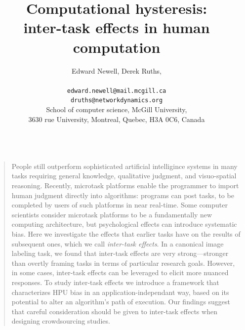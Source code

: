\documentclass[12pt]{article}
\title{Computational hysteresis:\\ inter-task effects in human computation}
\author
{Edward Newell, Derek Ruths,\\
\\
\normalsize{\texttt{edward.newell@mail.mcgill.ca}}\\
\normalsize{\texttt{druths@networkdynamics.org}}\\
\normalsize{School of computer science, McGill University,}\\
\normalsize{3630 rue University, Montreal, Quebec, H3A 0C6, Canada}\\
\\
}
\date{}
\newenvironment{sciabstract}{%
\begin{quote} \bf}
{\end{quote}}
\begin{document}
 


\baselineskip24pt


\maketitle 




\begin{sciabstract}

People still outperform sophisticated artificial 
intelligince systems in many tasks requiring general knowledge, 
qualitative judgment, and visuo-spatial reasoning. Recently, microtask 
platforms enable the programmer to import human judgment directly into 
algorithms: programs can post tasks, to be completed by users of such 
platforms in near real-time.
Some computer scientists consider microtask platforms to be a fundamentally
new computing architecture, but psychological effects can introduce systematic
bias. 
Here we investigate the effects that earlier tasks have on the results of 
subsequent ones, which we call \textit{inter-task effects}.
In a canonical image labeling task, we found that inter-task effects are
very strong---stronger than overtly framing tasks in terms of 
particular research goals.  However, in some cases, inter-task effects can
be leveraged to elicit more nuanced responses.
To study inter-task effects we introduce a framework that characterizes HPU 
bias in an application-independant way, based on its potential to alter an 
algorithm's path of execution.  Our findings suggest that careful consideration
should be given to inter-task effects when designing crowdsourcing studies. 


\end{sciabstract}
\end{document}
